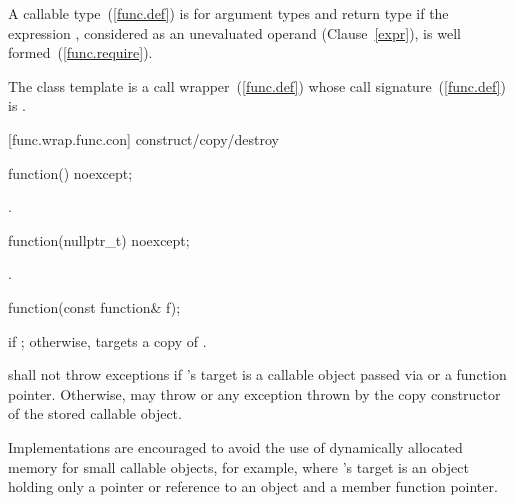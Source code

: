 \pnum
{}%
A callable type~(\ref{func.def}) 
is  for argument
types 
and return type 
if the expression
,
considered as an unevaluated operand (Clause~\ref{expr}), is
well formed~(\ref{func.require}).

\pnum
The  class template is a call
wrapper~(\ref{func.def}) whose call signature~(\ref{func.def})
is .

[func.wrap.func.con]{ construct/copy/destroy}

%
\begin{itemdecl}
function() noexcept;
\end{itemdecl}

\begin{itemdescr}
\pnum\postcondition {}.
\end{itemdescr}

%
\begin{itemdecl}
function(nullptr_t) noexcept;
\end{itemdecl}

\begin{itemdescr}
\pnum
\postcondition {}.
\end{itemdescr}

%
\begin{itemdecl}
function(const function& f);
\end{itemdecl}

\begin{itemdescr}
\pnum
\postconditions {} if ; otherwise,
 targets a copy of .

\pnum
\throws shall not throw exceptions if 's target is
a callable object passed via  or
a function pointer. Otherwise, may throw 
or any exception thrown by the copy constructor of the stored callable object.
\begin{note} Implementations are encouraged to avoid the use of
dynamically allocated memory for small callable objects, for example, where
's target is an object holding only a pointer or reference
to an object and a member function pointer. \end{note}
\end{itemdescr}

